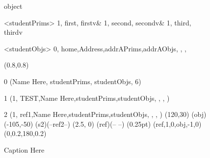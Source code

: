 \documentclass{article}
\begin{document}
\newcommand{\reference}{2}

\newcommand{\ObjectName}{Name Here}
\newcommand{\Caption}{Caption Here}
\newcommand{\First}{first}
\newcommand{\Firstv}{firstv}
\newcommand{\Second}{second}
\newcommand{\Secondv}{secondv}
\newcommand{\Third}{third}
\newcommand{\Thirdv}{thirdv}

\begin {figure}

\Draw

 {object}

\Indirect \Table <studentPrims>
{  
	1, \First, \Firstv &
    1, \Second, \Secondv &
    1, \Third, \Thirdv 
}

\Indirect \Table <studentObjs>
 {  0, home,Address,addrAPrims,addrAObjs, , , }

\Scale (0.8,0.8)

\if\reference0
\OD (\ObjectName, studentPrims, studentObjs, 6)
    \fi

\if\reference1
\Obj (1, TEST,\ObjectName,studentPrims,studentObjs, , , )
    \fi

\if\reference2
\Obj (1, ref1,\ObjectName,studentPrims,studentObjs, , , )
\Move(120,30)
\FcNode(obj)
\Move(-105,-50)
\Node(s2)(--ref2--)
\MoveToExit(2.5, 0)
\ORectNode(ref)(-- --)
\PenSize(0.25pt)
\CurvedEdgeAt(ref,1,0,obj,-1,0)(0,0.2,180,0.2)
\fi

\EndDraw

\caption {\Caption}

\label {fig:simpleStudent}

\end {figure}
\end{document}
